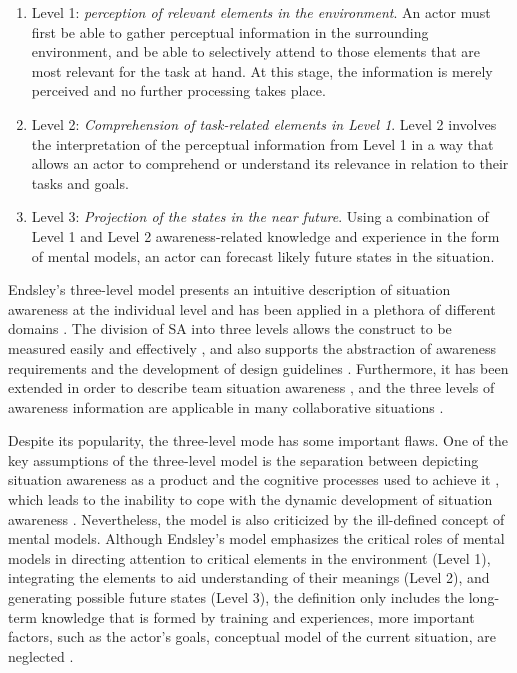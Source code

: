 \begin{enumerate}
	\item Level 1: \emph{perception of relevant elements in the environment}. An actor must first be able to gather perceptual information in the surrounding environment, and be able to selectively attend to those elements that are most relevant for the task at hand. At this stage, the information is merely perceived and no further processing takes place. 
	\item Level 2: \emph{Comprehension of task-related elements in Level 1}. Level 2 involves the interpretation of the perceptual information from Level 1 in a way that allows an actor to comprehend or understand its relevance in relation to their tasks and goals.
	\item Level 3: \emph{Projection of the states in the near future}. Using a combination of Level 1 and Level 2 awareness-related knowledge and experience in the form of mental models, an actor can forecast likely future states in the situation.
\end{enumerate}

Endsley's three-level model presents an intuitive description of situation awareness at the individual level and has been applied in a plethora of different domains \cite{Wickens2008}. The division of SA into three levels allows the construct to be measured easily and effectively \cite{endsley1995measurement}, and also supports the abstraction of awareness requirements and the development of design guidelines \cite{Salmon2008}. Furthermore, it has been extended in order to describe team situation awareness \cite{endsley2001model}, and the three levels of awareness information are applicable in many collaborative situations \cite{Gutwin2002}.

Despite its popularity, the three-level mode has some important flaws. One of the key assumptions of the three-level model is the separation between depicting situation awareness as a product and the cognitive processes used to achieve it \cite{Salmon2008}, which leads to the inability to cope with the dynamic development of situation awareness \cite{Smith1995,uhlarik2002review}. Nevertheless, the model is also criticized by the ill-defined concept of mental models. Although Endsley's model emphasizes the critical roles of mental models in directing attention to critical elements in the environment (Level 1), integrating the elements to aid understanding of their meanings (Level 2), and generating possible future states (Level 3), the definition only includes the long-term knowledge that is formed by training and experiences, more important factors, such as the actor's goals, conceptual model of the current situation, are neglected \cite{Bedny1999}.


